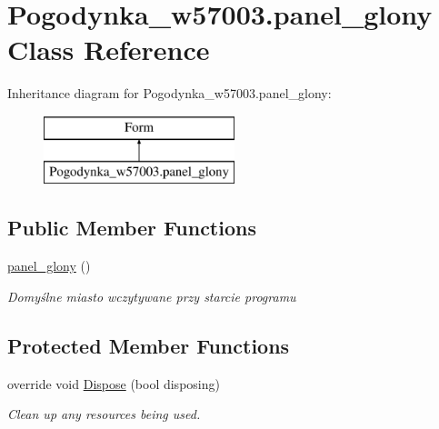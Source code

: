 \hypertarget{class_pogodynka__w57003_1_1panel__glony}{}\section{Pogodynka\+\_\+w57003.\+panel\+\_\+glony Class Reference}
\label{class_pogodynka__w57003_1_1panel__glony}
Inheritance diagram for Pogodynka\+\_\+w57003.\+panel\+\_\+glony\+:\begin{figure}[H]
\begin{center}
\leavevmode
\includegraphics[height=2.000000cm]{class_pogodynka__w57003_1_1panel__glony}
\end{center}
\end{figure}
\subsection*{Public Member Functions}
\begin{DoxyCompactItemize}
\item 
\mbox{\hyperlink{class_pogodynka__w57003_1_1panel__glony_a5722f839e53134d3fd67f320dec8056e}{panel\+\_\+glony}} ()
\begin{DoxyCompactList}\small\item\em Domyślne miasto wczytywane przy starcie programu \end{DoxyCompactList}\end{DoxyCompactItemize}
\subsection*{Protected Member Functions}
\begin{DoxyCompactItemize}
\item 
override void \mbox{\hyperlink{class_pogodynka__w57003_1_1panel__glony_af7cfae8068adcc3589d5b990b982e226}{Dispose}} (bool disposing)
\begin{DoxyCompactList}\small\item\em Clean up any resources being used. \end{DoxyCompactList}\end{DoxyCompactItemize}
